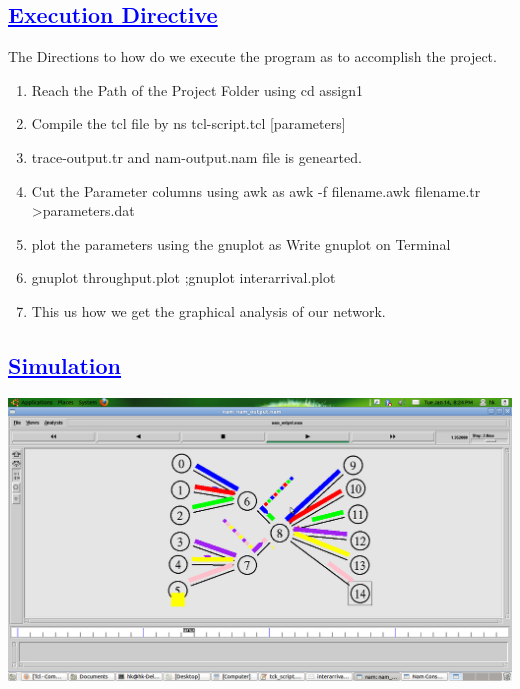 \documentclass[a4paper,12pt]{report}
\begin{document}
\begin{center}
\chapter{\textcolor{blue}{\underline {Execution Directive}}}
\end{center}
The Directions to how do we execute the program as to accomplish the project.
\begin{enumerate} 
\item Reach the Path of the Project Folder using cd assign1
\item Compile the tcl file by  ns tcl-script.tcl [parameters]  
\item trace-output.tr and nam-output.nam file is genearted.
\item Cut the Parameter columns using awk as   awk -f filename.awk filename.tr >parameters.dat 
\item plot the parameters using the gnuplot as  Write gnuplot on Terminal 
\item gnuplot throughput.plot ;gnuplot interarrival.plot
\item This us how we get the graphical analysis of our network.

\end{enumerate}



\begin{center}
\chapter{\textcolor{blue}{\underline {Simulation}}}


 \includegraphics[width=13 cm,height=13 cm]{./simulation.png}


\end{center}
\end{document}
